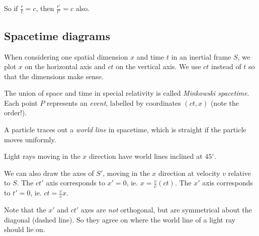 \documentclass[a4paper]{article}
\begin{document}
So if $\frac{r}{t} = c$, then $\frac{r'}{t'} = c$ also.

\subsection{Spacetime diagrams}
When considering one spatial dimension $x$ and time $t$ in an inertial frame $S$, we plot $x$ on the horizontal axis and $ct$ on the vertical axis. We use $ct$ instead of $t$ so that the dimensions make sense.

\begin{center}
\end{center}
\begin{defi}[Spacetime]
  The union of space and time in special relativity is called \emph{Minkowski spacetime}. Each point $P$ represents an \emph{event}, labelled by coordinates $(ct, x)$ (note the order!).

  A particle traces out a \emph{world line} in spacetime, which is straight if the particle moves uniformly.

  Light rays moving in the $x$ direction have world lines inclined at $45^\circ$.
  \begin{center}
  \end{center}
\end{defi}

We can also draw the axes of $S'$, moving in the $x$ direction at velocity $v$ relative to $S$. The $ct'$ axis corresponds to $x' = 0$, ie. $x = \frac{v}{c}(ct)$. The $x'$ axis corresponds to $t' = 0$, ie. $ct = \frac{v}{c}x$.
\begin{center}
\end{center}
Note that the $x'$ and $ct'$ axes are \emph{not} orthogonal, but are symmetrical about the diagonal (dashed line). So they agree on where the world line of a light ray should lie on.
\end{document}
